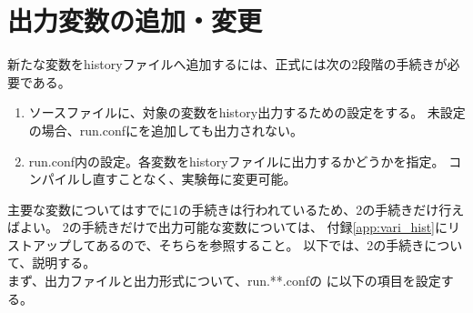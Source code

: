 \section{出力変数の追加・変更} \label{sec:output}
新たな変数をhistoryファイルへ追加するには、正式には次の2段階の手続きが必要である。

\begin{enumerate}
\item ソースファイルに、対象の変数をhistory出力するための設定をする。
未設定の場合、run.confにを追加しても出力されない。
\item run.conf内の設定。各変数をhistoryファイルに出力するかどうかを指定。
コンパイルし直すことなく、実験毎に変更可能。
\end{enumerate}
主要な変数についてはすでに1の手続きは行われているため、2の手続きだけ行えばよい。
2の手続きだけで出力可能な変数については、
付録\ref{app:vari_hist}にリストアップしてあるので、そちらを参照すること。
以下では、2の手続きについて、説明する。\\

まず、出力ファイルと出力形式について、run.**.confの
に以下の項目を設定する。\\

\\

